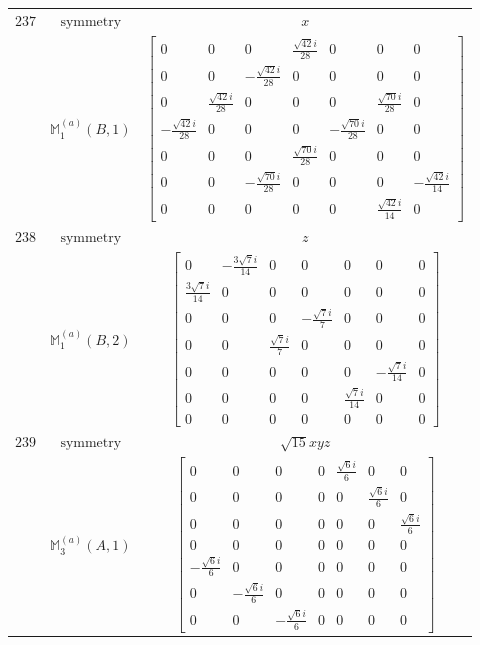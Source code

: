 \documentclass[fleqn,8pt,landscape]{jsarticle}
\begin{document}
\begin{longtable}{ccc}
$ 237 $ & $ \text{symmetry} $ & $ x $ \\
$  $ & $ \mathbb{M}_{1}^{(a)}(B,1) $ & $ \begin{bmatrix} 0 & 0 & 0 & \frac{\sqrt{42} i}{28} & 0 & 0 & 0 \\ 0 & 0 & - \frac{\sqrt{42} i}{28} & 0 & 0 & 0 & 0 \\ 0 & \frac{\sqrt{42} i}{28} & 0 & 0 & 0 & \frac{\sqrt{70} i}{28} & 0 \\ - \frac{\sqrt{42} i}{28} & 0 & 0 & 0 & - \frac{\sqrt{70} i}{28} & 0 & 0 \\ 0 & 0 & 0 & \frac{\sqrt{70} i}{28} & 0 & 0 & 0 \\ 0 & 0 & - \frac{\sqrt{70} i}{28} & 0 & 0 & 0 & - \frac{\sqrt{42} i}{14} \\ 0 & 0 & 0 & 0 & 0 & \frac{\sqrt{42} i}{14} & 0 \end{bmatrix} $ \\ \hline
$ 238 $ & $ \text{symmetry} $ & $ z $ \\
$  $ & $ \mathbb{M}_{1}^{(a)}(B,2) $ & $ \begin{bmatrix} 0 & - \frac{3 \sqrt{7} i}{14} & 0 & 0 & 0 & 0 & 0 \\ \frac{3 \sqrt{7} i}{14} & 0 & 0 & 0 & 0 & 0 & 0 \\ 0 & 0 & 0 & - \frac{\sqrt{7} i}{7} & 0 & 0 & 0 \\ 0 & 0 & \frac{\sqrt{7} i}{7} & 0 & 0 & 0 & 0 \\ 0 & 0 & 0 & 0 & 0 & - \frac{\sqrt{7} i}{14} & 0 \\ 0 & 0 & 0 & 0 & \frac{\sqrt{7} i}{14} & 0 & 0 \\ 0 & 0 & 0 & 0 & 0 & 0 & 0 \end{bmatrix} $ \\ \hline
$ 239 $ & $ \text{symmetry} $ & $ \sqrt{15} x y z $ \\
$  $ & $ \mathbb{M}_{3}^{(a)}(A,1) $ & $ \begin{bmatrix} 0 & 0 & 0 & 0 & \frac{\sqrt{6} i}{6} & 0 & 0 \\ 0 & 0 & 0 & 0 & 0 & \frac{\sqrt{6} i}{6} & 0 \\ 0 & 0 & 0 & 0 & 0 & 0 & \frac{\sqrt{6} i}{6} \\ 0 & 0 & 0 & 0 & 0 & 0 & 0 \\ - \frac{\sqrt{6} i}{6} & 0 & 0 & 0 & 0 & 0 & 0 \\ 0 & - \frac{\sqrt{6} i}{6} & 0 & 0 & 0 & 0 & 0 \\ 0 & 0 & - \frac{\sqrt{6} i}{6} & 0 & 0 & 0 & 0 \end{bmatrix} $ \\ \hline

\end{longtable}
\end{document}
